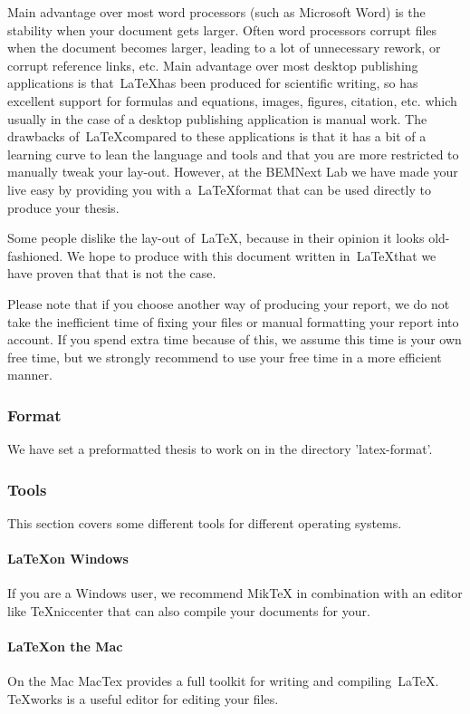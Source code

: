 \documentclass{latex-format/stylesheets/BEMNextstyle}
\begin{document}
Main advantage over most word processors (such as Microsoft Word)  is the stability when your document gets larger. Often word processors corrupt files when the document becomes larger, leading to a lot of unnecessary rework, or corrupt reference links, etc. Main advantage over most desktop publishing applications is that~\LaTeX has been produced for scientific writing, so has excellent support for formulas and equations, images, figures, citation, etc. which usually in the case of a desktop publishing application is manual work.
The drawbacks of~\LaTeX compared to these applications is that it has a bit of a learning curve to lean the language and tools and that you are more restricted to manually tweak your lay-out.
However, at the BEMNext Lab we have made your live easy by providing you with a~\LaTeX format that can be used directly to produce your thesis.

Some people dislike the lay-out of~\LaTeX, because in their opinion it looks old-fashioned. We hope to produce with this document written in~\LaTeX that we have proven that that is not the case.

Please note that if you choose another way of producing your report, we do not take the inefficient time of fixing your files or manual formatting your report into account. If you spend extra time because of this, we assume this time is your own free time, but we strongly recommend to use your free time in a more efficient manner.

\subsubsection*{Format}
We have set a preformatted thesis to work on in the directory 'latex-format'.

\subsubsection*{Tools}
This section covers some different tools for different operating systems.

\paragraph*{\LaTeX on Windows}
If you are a Windows user, we recommend MikTeX in combination with an editor like TeXniccenter that can also compile your documents for your.

\paragraph*{\LaTeX on the Mac}
On the Mac MacTex provides a full toolkit for writing and compiling~\LaTeX. TeXworks is a useful editor for editing your files.
\end{document}
